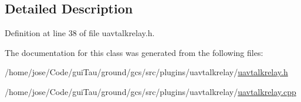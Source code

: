 \subsection{Detailed Description}


Definition at line 38 of file uavtalkrelay.\-h.



The documentation for this class was generated from the following files\-:\begin{DoxyCompactItemize}
\item 
/home/jose/\-Code/gui\-Tau/ground/gcs/src/plugins/uavtalkrelay/\hyperlink{uavtalkrelay_8h}{uavtalkrelay.\-h}\item 
/home/jose/\-Code/gui\-Tau/ground/gcs/src/plugins/uavtalkrelay/\hyperlink{uavtalkrelay_8cpp}{uavtalkrelay.\-cpp}\end{DoxyCompactItemize}
